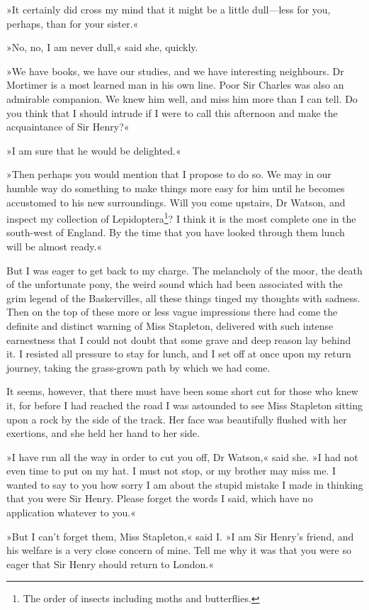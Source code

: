 »It certainly did cross my mind that it might be a little dull—less for you, perhaps, than for your sister.«

»No, no, I am never dull,« said she, quickly.

»We have books, we have our studies, and we have interesting neighbours. Dr Mortimer is a most learned man in his own line. Poor Sir Charles was also an admirable companion. We knew him well, and miss him more than I can tell. Do you think that I should intrude if I were to call this afternoon and make the acquaintance of Sir Henry?«

»I am sure that he would be delighted.«

»Then perhaps you would mention that I propose to do so. We may in our humble way do something to make things more easy for him until he becomes accustomed to his new surroundings. Will you come upstairs, Dr Watson, and inspect my collection of Lepidoptera\footnote{The order of insects including moths and butterflies.}? I think it is the most complete one in the south-west of England. By the time that you have looked through them lunch will be almost ready.«

But I was eager to get back to my charge. The melancholy of the moor, the death of the unfortunate pony, the weird sound which had been associated with the grim legend of the Baskervilles, all these things tinged my thoughts with sadness. Then on the top of these more or less vague impressions there had come the definite and distinct warning of Miss Stapleton, delivered with such intense earnestness that I could not doubt that some grave and deep reason lay behind it. I resisted all pressure to stay for lunch, and I set off at once upon my return journey, taking the grass-grown path by which we had come.

It seems, however, that there must have been some short cut for those who knew it, for before I had reached the road I was astounded to see Miss Stapleton sitting upon a rock by the side of the track. Her face was beautifully flushed with her exertions, and she held her hand to her side.

»I have run all the way in order to cut you off, Dr Watson,« said she. »I had not even time to put on my hat. I must not stop, or my brother may miss me. I wanted to say to you how sorry I am about the stupid mistake I made in thinking that you were Sir Henry. Please forget the words I said, which have no application whatever to you.«

»But I can't forget them, Miss Stapleton,« said I. »I am Sir Hen\-ry's friend, and his welfare is a very close concern of mine. Tell me why it was that you were so eager that Sir Henry should return to London.«

